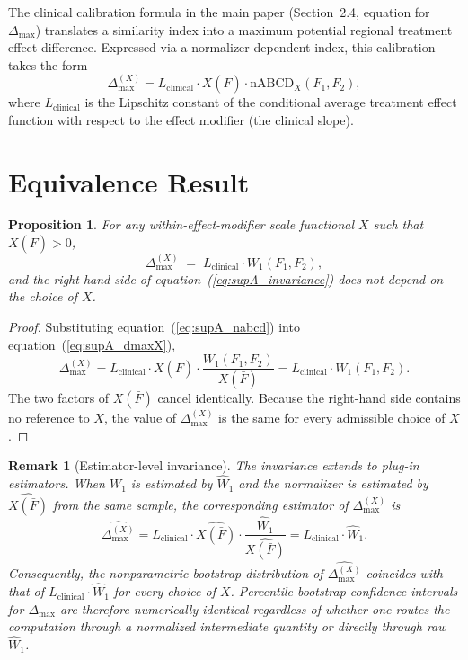 \documentclass[11pt]{article}
\newtheorem{proposition}{Proposition}
\newtheorem{remark}{Remark}
\begin{document}
The clinical calibration formula in the main paper (Section~2.4, equation for $\Delta_{\max}$) translates a similarity index into a maximum potential regional treatment effect difference. Expressed via a normalizer-dependent index, this calibration takes the form
\begin{equation}
\Delta_{\max}^{(X)} = L_{\text{clinical}} \cdot X(\bar{F}) \cdot \text{nABCD}_X(F_1, F_2),
\label{eq:supA_dmaxX}
\end{equation}
where $L_{\text{clinical}}$ is the Lipschitz constant of the conditional average treatment effect function with respect to the effect modifier (the clinical slope).

\section{Equivalence Result}\label{sec:supA_main}

\begin{proposition}\label{prop:supA_equivalence}
For any within-effect-modifier scale functional $X$ such that $X(\bar{F}) > 0$,
\begin{equation}
\Delta_{\max}^{(X)} \;=\; L_{\text{clinical}} \cdot W_1(F_1, F_2),
\label{eq:supA_invariance}
\end{equation}
and the right-hand side of equation~(\ref{eq:supA_invariance}) does not depend on the choice of $X$.
\end{proposition}

\begin{proof}
Substituting equation~(\ref{eq:supA_nabcd}) into equation~(\ref{eq:supA_dmaxX}),
\[
\Delta_{\max}^{(X)} = L_{\text{clinical}} \cdot X(\bar{F}) \cdot \frac{W_1(F_1, F_2)}{X(\bar{F})} = L_{\text{clinical}} \cdot W_1(F_1, F_2).
\]
The two factors of $X(\bar{F})$ cancel identically. Because the right-hand side contains no reference to $X$, the value of $\Delta_{\max}^{(X)}$ is the same for every admissible choice of $X$.
\end{proof}

\begin{remark}[Estimator-level invariance]\label{rem:supA_estimator}
The invariance extends to plug-in estimators. When $W_1$ is estimated by $\widehat{W}_1$ and the normalizer is estimated by $\widehat{X(\bar{F})}$ from the same sample, the corresponding estimator of $\Delta_{\max}^{(X)}$ is
\[
\widehat{\Delta_{\max}^{(X)}} = L_{\text{clinical}} \cdot \widehat{X(\bar{F})} \cdot \frac{\widehat{W}_1}{\widehat{X(\bar{F})}} = L_{\text{clinical}} \cdot \widehat{W}_1.
\]
Consequently, the nonparametric bootstrap distribution of $\widehat{\Delta_{\max}^{(X)}}$ coincides with that of $L_{\text{clinical}} \cdot \widehat{W}_1$ for every choice of $X$. Percentile bootstrap confidence intervals for $\Delta_{\max}$ are therefore numerically identical regardless of whether one routes the computation through a normalized intermediate quantity or directly through raw $\widehat{W}_1$.
\end{remark}
\end{document}
